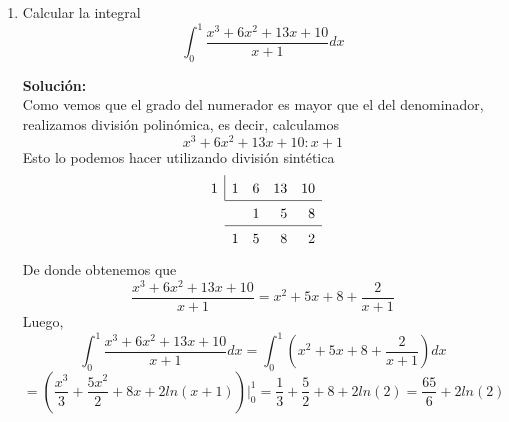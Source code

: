 \documentclass[12pt]{article}
\newenvironment{solucion}
{\begin{mdframed}[backgroundcolor=black!10]
		{\bf Solución:}\\
	}
	{
	\end{mdframed}
}
\newenvironment{preguntas}
{\begin{enumerate}\itemsep12pt
	}
	{
	\end{enumerate}
}
\newcommand{\ev}{\Big|}
\newcommand{\ra}{\rightarrow}
\begin{document}
\begin{preguntas}
\begin{solucion}
		$$\dfrac{1}{x(2-x)} = \dfrac{2A-Ax + Bx}{x(2-x)}$$
		$$\dfrac{1}{x(2-x)} = \dfrac{2A+ (B-A)x}{x(2-x)}$$
		De esta forma, tenemos el siguiente sistema de ecuaciones
		$$2A = 1, \quad B-A = 0 \ra A = \dfrac{1}{2}, \quad B = \dfrac{1}{2}$$
		Entonces, tenemos que la descomposición es
		$$\dfrac{1}{x(2-x)} = \dfrac{1}{2x} + \dfrac{1}{2(2-x)}$$
		Luego, la integral original la podemos escribir como
		$$\displaystyle\int \dfrac{dx}{x(2-x)} = \displaystyle\int \dfrac{dx}{2x} + \displaystyle\int \dfrac{dx}{2(2-x)}$$
		$$ = \dfrac{1}{2} \left( \displaystyle\int \dfrac{dx}{x} + \displaystyle\int \dfrac{dx}{2-x} \right)$$
		$$ = \dfrac{1}{2} (ln|x| - ln|2-x| ) + c$$
\end{solucion}
\item Calcular la integral
	$$\displaystyle\int_0^1 \dfrac{x^3+6x^2+13x+10}{x+1}dx$$
\begin{solucion}
Como vemos que el grado del numerador es mayor que el del denominador, realizamos división polinómica, es decir, calculamos
		$$x^3+6x^2+13x+10 : x+1$$
		Esto lo podemos hacer utilizando división sintética
		$$
		\renewcommand\arraystretch{1.5}
		\setlength\doublerulesep{0pt}
		\begin{array}{rrrrr}
		\multicolumn{1}{r|}{1} & 1 & 6 & 13 & 10\\\cline{2-5}
		& & 1& 5 & 8 \\\cline{2-5}
		& 1 & 5& 8 & 2 
		\end{array}
		$$
		De donde obtenemos que
		$$\dfrac{x^3+6x^2+13x+10}{x+1} = x^2 +5x + 8 + \dfrac{2}{x+1}$$
		Luego,
		$$\displaystyle\int_0^1 \dfrac{x^3+6x^2+13x+10}{x+1}dx = \displaystyle\int_0^1 \left(x^2 + 5x + 8 +  \dfrac{2}{x+1}\right)dx$$
		$$= \left( \dfrac{x^3}{3} + \dfrac{5x^2}{2} + 8x + 2ln(x+1)\right) \ev_0^1 = \dfrac{1}{3} + \dfrac{5}{2} + 8 + 2ln(2) = \dfrac{65}{6} + 2 ln(2)$$
\end{solucion}
\end{preguntas}
\end{document}
